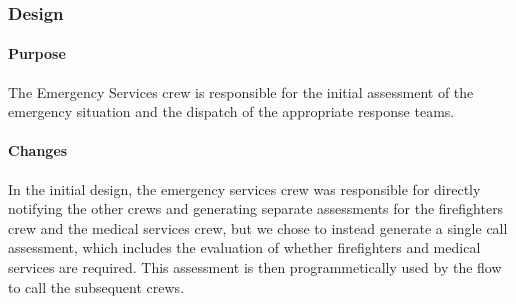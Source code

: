 \subsubsection{Design}

\paragraph{Purpose}
The Emergency Services crew is responsible for the initial assessment of the emergency situation and the dispatch of the appropriate response teams.

\paragraph{Changes}
In the initial design, the emergency services crew was responsible for directly notifying the other crews
and generating separate assessments for the firefighters crew and the medical services crew, but we
chose to instead generate a single call assessment, which includes the evaluation of whether firefighters
and medical services are required. This assessment is then programmetically used by the flow to call the subsequent crews.
